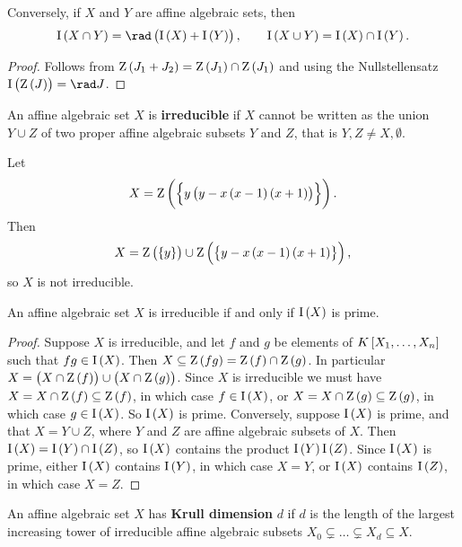 \begin{corollary}
Conversely, if $ X $ and $ Y $ are affine algebraic sets, then
$$ \I\br{X \cap Y} = \rad \br{\I\br{X} + \I\br{Y}}, \qquad \I\br{X \cup Y} = \I\br{X} \cap \I\br{Y}. $$
\end{corollary}

\begin{proof}
Follows from $ \Z\br{J_1 + J_2} = \Z\br{J_1} \cap \Z\br{J_1} $ and using the Nullstellensatz $ \I\br{\Z\br{J}} = \rad J $.
\end{proof}

\begin{definition}
An affine algebraic set $ X $ is \textbf{irreducible} if $ X $ cannot be written as the union $ Y \cup Z $ of two proper affine algebraic subsets $ Y $ and $ Z $, that is $ Y, Z \ne X, \emptyset $.
\end{definition}

\begin{example*}
Let
$$ X = \Z\br{\cbr{y\br{y - x\br{x - 1}\br{x + 1}}}}. $$
Then
$$ X = \Z\br{\cbr{y}} \cup \Z\br{\cbr{y - x\br{x - 1}\br{x + 1}}}, $$
so $ X $ is not irreducible.
\end{example*}

\pagebreak

\begin{proposition}
An affine algebraic set $ X $ is irreducible if and only if $ \I\br{X} $ is prime.
\end{proposition}

\begin{proof}
Suppose $ X $ is irreducible, and let $ f $ and $ g $ be elements of $ K\sbr{X_1, \dots, X_n} $ such that $ fg \in \I\br{X} $. Then $ X \subseteq \Z\br{fg} = \Z\br{f} \cap \Z\br{g} $. In particular $ X = \br{X \cap \Z\br{f}} \cup \br{X \cap \Z\br{g}} $. Since $ X $ is irreducible we must have $ X = X \cap \Z\br{f} \subseteq \Z\br{f} $, in which case $ f \in \I\br{X} $, or $ X = X \cap \Z\br{g} \subseteq \Z\br{g} $, in which case $ g \in \I\br{X} $. So $ \I\br{X} $ is prime. Conversely, suppose $ \I\br{X} $ is prime, and that $ X = Y \cup Z $, where $ Y $ and $ Z $ are affine algebraic subsets of $ X $. Then $ \I\br{X} = \I\br{Y} \cap \I\br{Z} $, so $ \I\br{X} $ contains the product $ \I\br{Y}\I\br{Z} $. Since $ \I\br{X} $ is prime, either $ \I\br{X} $ contains $ \I\br{Y} $, in which case $ X = Y $, or $ \I\br{X} $ contains $ \I\br{Z} $, in which case $ X = Z $.
\end{proof}

\begin{definition}
An affine algebraic set $ X $ has \textbf{Krull dimension} $ d $ if $ d $ is the length of the largest increasing tower of irreducible affine algebraic subsets $ X_0 \subsetneq \dots \subsetneq X_d \subseteq X $.
\end{definition}

